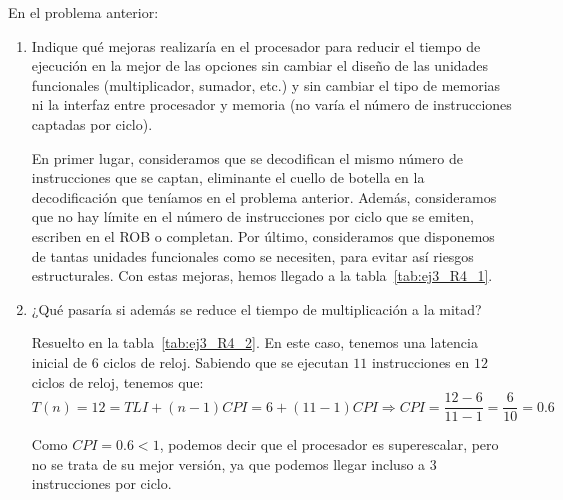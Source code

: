 \begin{ejercicio}\label{ej:3_R4}
   En el problema anterior: 
   \begin{enumerate}
       \item Indique qué mejoras realizaría en el procesador para reducir el tiempo de ejecución en la mejor de las opciones sin cambiar el diseño de las unidades funcionales (multiplicador, sumador, etc.) y sin cambiar el tipo de memorias ni la interfaz entre procesador y memoria (no varía el número de instrucciones captadas por ciclo).
       
       En primer lugar, consideramos que se decodifican el mismo número de instrucciones que se captan,
       eliminante el cuello de botella en la decodificación que teníamos en el problema anterior.
       Además, consideramos que no hay límite en el número de instrucciones por ciclo que se emiten, escriben en el ROB o completan.
       Por último, consideramos que disponemos de tantas unidades funcionales como se necesiten, para evitar así riesgos estructurales.
       Con estas mejoras, hemos llegado a la tabla~\ref{tab:ej3_R4_1}.
       
       \item ¿Qué pasaría si además se reduce el tiempo de multiplicación a la mitad?
       
       Resuelto en la tabla~\ref{tab:ej3_R4_2}. En este caso, tenemos una latencia inicial de $6$
       ciclos de reloj. Sabiendo que se ejecutan $11$ instrucciones en $12$ ciclos de reloj,
       tenemos que:
       \begin{equation*}
        T(n) = 12 = TLI + (n-1)CPI = 6 + (11-1)CPI \Rightarrow CPI = \frac{12-6}{11-1} = \frac{6}{10} = 0.6
       \end{equation*}

       Como $CPI=0.6<1$, podemos decir que el procesador es superescalar, pero no se trata de su
       mejor versión, ya que podemos llegar incluso a $3$ instrucciones por ciclo.
   \end{enumerate}
   

\end{ejercicio}
